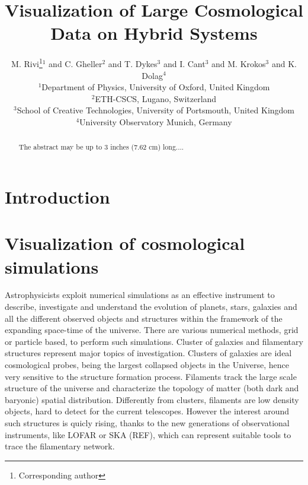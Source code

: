\documentclass{egpubl}
\title[Visualization of Large Cosmological Data on Hybrid Systems]%
      {Visualization of Large Cosmological Data on Hybrid Systems}
\author[M. Rivi \& C. Gheller \& T. Dykes \& I. Cant \& M. Krokos \& K. Dolag]
       {M. Rivi\thanks{Corresponding author}$^{1}$
        and C. Gheller$^{2}$ and T. Dykes$^{3}$ and I. Cant$^3$ and M. Krokos$^{3}$ and K. Dolag$^{4}$
        \\
         $^1$Department of Physics, University of Oxford, United Kingdom\\
         $^2$ETH-CSCS, Lugano, Switzerland\\
         $^3$School of Creative Technologies, University of Portsmouth, United Kingdom\\
         $^4$University Observatory Munich, Germany
       }
\begin{document}

\maketitle

\begin{abstract}
   The abstract may be up to 3 inches (7.62 cm) long.... 

\begin{classification} %
\end{classification}

\end{abstract}

 
\section{Introduction}

\section{Visualization of cosmological simulations}

Astrophysicists exploit numerical simulations as an effective instrument to describe, 
investigate and understand the evolution of planets, stars, galaxies and all
the different observed objects and structures 
within the framework of the expanding space-time of the universe. 
There are various numerical methods, grid or particle based, to
perform such simulations. Cluster of galaxies and filamentary structures represent
major topics of investigation. Clusters of galaxies are ideal cosmological probes, being 
the largest collapsed objects in the Universe, hence very sensitive to the structure formation process.
Filaments track the large scale structure of the universe and characterize the 
topology of matter (both dark and baryonic) spatial distribution. Differently from clusters,
filaments are low density objects, hard to detect for the current telescopes. However the interest
around such structures is quicly rising, thanks to the new generations of observational
instruments, like LOFAR or SKA (REF), which can represent suitable tools to trace the filamentary network.
\end{document}
